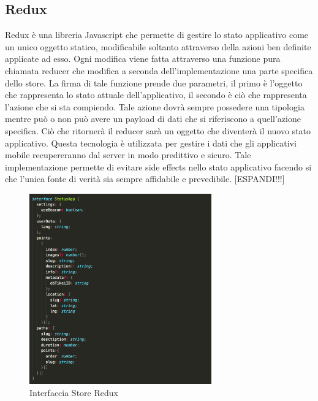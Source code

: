 	\subsection{Redux}\vspace{5mm}
	
	Redux è una libreria Javascript che permette di gestire lo stato applicativo come un unico oggetto statico, modificabile soltanto attraverso della azioni ben definite applicate ad esso. Ogni modifica viene fatta attraverso una funzione pura\cite{PureFunction} chiamata reducer che modifica a seconda dell'implementazione una parte specifica dello store. La firma di tale funzione prende due parametri, il primo è l'oggetto che rappresenta lo stato attuale dell'applicativo, il secondo è ciò che rappresenta l'azione che si sta compiendo. Tale azione dovrà sempre possedere una tipologia mentre può o non può avere un payload di dati che si riferiscono a quell'azione specifica. Ciò che ritornerà il reducer sarà un oggetto che diventerà il nuovo stato applicativo. Questa tecnologia è utilizzata per gestire i dati che gli applicativi mobile recupereranno dal server in modo predittivo e sicuro. Tale implementazione permette di evitare side effects\cite{SideEffects} nello stato applicativo facendo si che l'unica fonte di verità sia sempre affidabile e prevedibile.  [ESPANDI!!!] \vspace{5mm}
	
\begin{figure}[h]
\centering
\includegraphics[width=0.7\textwidth]{images/store.png}
\caption{Interfaccia Store Redux}
\end{figure}
\vspace{5mm}


